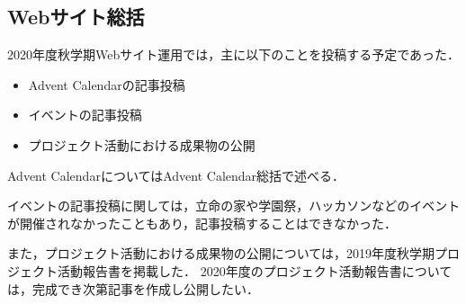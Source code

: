\subsection*{Webサイト総括}



2020年度秋学期Webサイト運用では，主に以下のことを投稿する予定であった．

\begin{itemize}
  \item Advent Calendarの記事投稿
  \item イベントの記事投稿
  \item プロジェクト活動における成果物の公開
\end{itemize}

Advent CalendarについてはAdvent Calendar総括で述べる．

イベントの記事投稿に関しては，立命の家や学園祭，ハッカソンなどのイベントが開催されなかったこともあり，記事投稿することはできなかった．

また，プロジェクト活動における成果物の公開については，2019年度秋学期プロジェクト活動報告書を掲載した．
2020年度のプロジェクト活動報告書については，完成でき次第記事を作成し公開したい．
